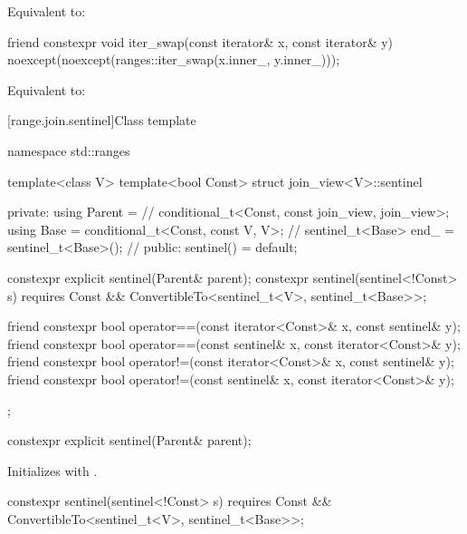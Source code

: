 \begin{itemdescr}
\pnum
\effects Equivalent to: 
\end{itemdescr}

\begin{itemdecl}
friend constexpr void iter_swap(const iterator& x, const iterator& y)
  noexcept(noexcept(ranges::iter_swap(x.inner_, y.inner_)));
\end{itemdecl}

\begin{itemdescr}
\pnum
\effects Equivalent to: 
\end{itemdescr}

[range.join.sentinel]{Class template }

\begin{codeblock}
namespace std::ranges {
  template<class V>
  template<bool Const>
  struct join_view<V>::sentinel {
  private:
    using Parent =                                      // \expos
      conditional_t<Const, const join_view, join_view>;
    using Base   = conditional_t<Const, const V, V>;    // \expos
    sentinel_t<Base> end_ = sentinel_t<Base>();         // \expos
  public:
    sentinel() = default;

    constexpr explicit sentinel(Parent& parent);
    constexpr sentinel(sentinel<!Const> s)
      requires Const && ConvertibleTo<sentinel_t<V>, sentinel_t<Base>>;

    friend constexpr bool operator==(const iterator<Const>& x, const sentinel& y);
    friend constexpr bool operator==(const sentinel& x, const iterator<Const>& y);
    friend constexpr bool operator!=(const iterator<Const>& x, const sentinel& y);
    friend constexpr bool operator!=(const sentinel& x, const iterator<Const>& y);
  };
}
\end{codeblock}

\begin{itemdecl}
constexpr explicit sentinel(Parent& parent);
\end{itemdecl}

\begin{itemdescr}
\pnum
\effects Initializes  with .
\end{itemdescr}

\begin{itemdecl}
constexpr sentinel(sentinel<!Const> s)
  requires Const && ConvertibleTo<sentinel_t<V>, sentinel_t<Base>>;
\end{itemdecl}

